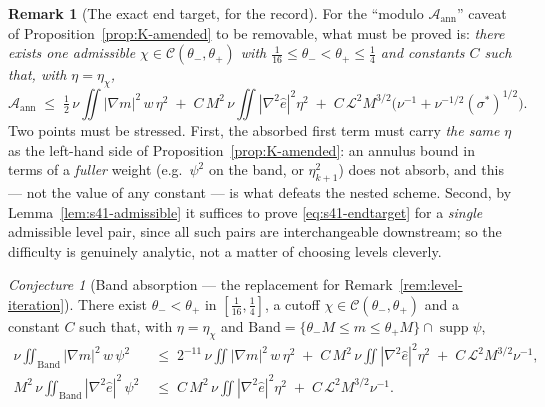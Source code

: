 \documentclass[11pt]{article}
\theoremstyle{definition}
\newtheorem{remark}[theorem]{Remark}
\theoremstyle{remark}
\newtheorem{conjecture}[theorem]{Conjecture}
\begin{document}
\begin{remark}[The exact end target, for the record]\label{rem:s41-endtarget}
  For the ``modulo $\mathcal{A}_{\mathrm{ann}}$'' caveat of
  Proposition~\ref{prop:K-amended} to be removable, what must be proved is:
  \emph{there exists one admissible $\chi\in\mathcal{C}(\theta_-,\theta_+)$
  with $\tfrac1{16}\leq\theta_-<\theta_+\leq\tfrac14$ and constants
  $C$ such that, with $\eta=\eta_\chi$,}
  \begin{equation}\label{eq:s41-endtarget}
    \mathcal{A}_{\mathrm{ann}}
    \;\leq\; \tfrac12\,\nu\iint|\nabla m|^2\,w\,\eta^2
      \;+\; C\,M^2\,\nu\iint|\nabla^2\hat{e}|^2\eta^2
      \;+\; C\,\mathcal{L}^2M^{3/2}
        \bigl(\nu^{-1}+\nu^{-1/2}(\sigma^*)^{1/2}\bigr).
  \end{equation}
  Two points must be stressed. First, the absorbed first term must carry
  \emph{the same} $\eta$ as the left-hand side of
  Proposition~\ref{prop:K-amended}: an annulus bound in terms of a
  \emph{fuller} weight (e.g.\ $\psi^2$ on the band, or $\eta_{k+1}^2$) does
  not absorb, and this --- not the value of any constant --- is what defeats
  the nested scheme. Second, by Lemma~\ref{lem:s41-admissible} it suffices
  to prove \eqref{eq:s41-endtarget} for a \emph{single} admissible level
  pair, since all such pairs are interchangeable downstream; so the
  difficulty is genuinely analytic, not a matter of choosing levels
  cleverly.
\end{remark}

\begin{conjecture}[Band absorption --- the replacement for
  Remark~\ref{rem:level-iteration}]\label{target:band-absorption}
  There exist $\theta_-<\theta_+$ in $[\tfrac1{16},\tfrac14]$, a cutoff
  $\chi\in\mathcal{C}(\theta_-,\theta_+)$ and a constant $C$ such that, with
  $\eta=\eta_\chi$ and
  $\mathrm{Band}=\{\theta_-M\leq m\leq\theta_+M\}\cap\operatorname{supp}\psi$,
  \begin{align}
    \nu\iint_{\mathrm{Band}}|\nabla m|^2\,w\,\psi^2
    &\;\leq\; 2^{-11}\,\nu\iint|\nabla m|^2\,w\,\eta^2
      \;+\; C\,M^2\,\nu\iint|\nabla^2\hat{e}|^2\eta^2
      \;+\; C\,\mathcal{L}^2M^{3/2}\nu^{-1},
      \label{eq:s41-bandY}\\
    M^2\,\nu\iint_{\mathrm{Band}}|\nabla^2\hat{e}|^2\,\psi^2
    &\;\leq\; C\,M^2\,\nu\iint|\nabla^2\hat{e}|^2\eta^2
      \;+\; C\,\mathcal{L}^2M^{3/2}\nu^{-1}.
      \label{eq:s41-bandD}
  \end{align}
\end{conjecture}
\end{document}
